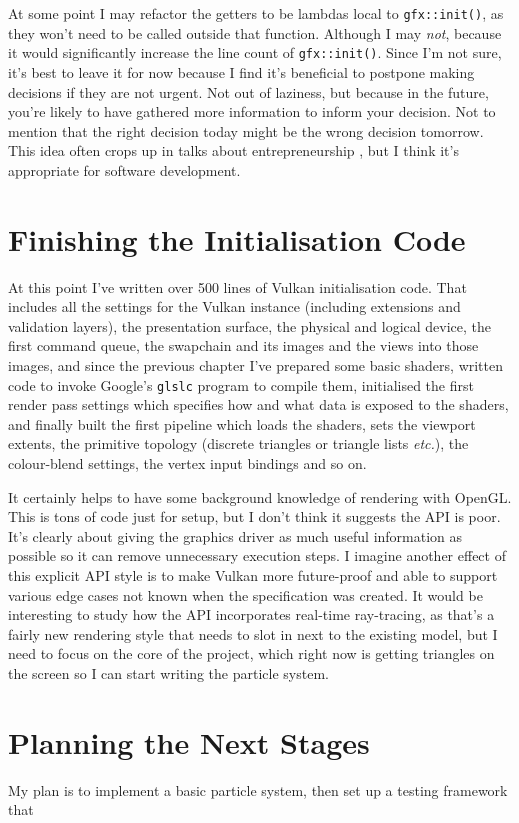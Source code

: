 \documentclass[11pt, a4paper, twocolumn]{article}
\begin{document}
At some point I may refactor the getters to be lambdas local to \verb|gfx::init()|, as they won't need to be called outside that function. Although I may \emph{not}, because it would significantly increase the line count of \verb|gfx::init()|. Since I'm not sure, it's best to leave it for now because I find it's beneficial to postpone making decisions if they are not urgent. Not out of laziness, but because in the future, you're likely to have gathered more information to inform your decision. Not to mention that the right decision today might be the wrong decision tomorrow. This idea often crops up in talks about entrepreneurship \citep{Knott-Craig2017}, but I think it's appropriate for software development.

\section{Finishing the Initialisation Code}

At this point I've written over 500 lines of Vulkan initialisation code. That includes all the settings for the Vulkan instance (including extensions and validation layers), the presentation surface, the physical and logical device, the first command queue, the swapchain and its images and the views into those images, and since the previous chapter I've prepared some basic shaders, written code to invoke Google's \verb|glslc| program to compile them, initialised the first render pass settings which specifies how and what data is exposed to the shaders, and finally built the first pipeline which loads the shaders, sets the viewport extents, the primitive topology (discrete triangles or triangle lists \emph{etc.}), the colour-blend settings, the vertex input bindings and so on.

It certainly helps to have some background knowledge of rendering with OpenGL. This is tons of code just for setup, but I don't think it suggests the API is poor. It's clearly about giving the graphics driver as much useful information as possible so it can remove unnecessary execution steps. I imagine another effect of this explicit API style is to make Vulkan more future-proof and able to support various edge cases not known when the specification was created. It would be interesting to study how the API incorporates real-time ray-tracing, as that's a fairly new rendering style that needs to slot in next to the existing model, but I need to focus on the core of the project, which right now is getting triangles on the screen so I can start writing the particle system.

\section{Planning the Next Stages}

My plan is to implement a basic particle system, then set up a testing framework that 




\end{document}
